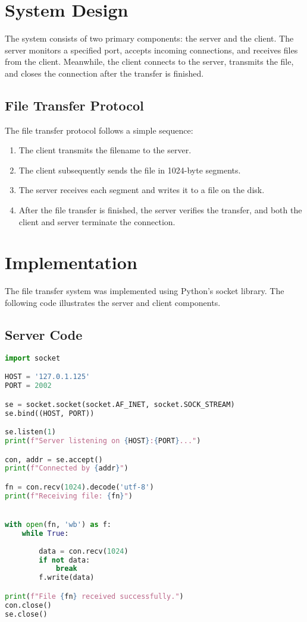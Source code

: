 \documentclass[a4paper,12pt]{article}
\begin{document}
\section{System Design}
The system consists of two primary components: the server and the client. The server monitors a specified port, accepts incoming connections, and receives files from the client. Meanwhile, the client connects to the server, transmits the file, and closes the connection after the transfer is finished.

\subsection{File Transfer Protocol}
The file transfer protocol follows a simple sequence:
\begin{enumerate}
    \item The client transmits the filename to the server.
    \item The client subsequently sends the file in 1024-byte segments.
    \item The server receives each segment and writes it to a file on the disk.
    \item After the file transfer is finished, the server verifies the transfer, and both the client and server terminate the connection.
\end{enumerate}

\section{Implementation}
The file transfer system was implemented using Python's socket library. The following code illustrates the server and client components.

\subsection{Server Code}

\begin{lstlisting}[language=Python, caption=Server Code]
import socket

HOST = '127.0.1.125'  
PORT = 2002   

se = socket.socket(socket.AF_INET, socket.SOCK_STREAM)
se.bind((HOST, PORT))

se.listen(1)
print(f"Server listening on {HOST}:{PORT}...")

con, addr = se.accept()
print(f"Connected by {addr}")

fn = con.recv(1024).decode('utf-8') 
print(f"Receiving file: {fn}")


with open(fn, 'wb') as f:
    while True:
        
        data = con.recv(1024)
        if not data:
            break  
        f.write(data)

print(f"File {fn} received successfully.")
con.close() 
se.close()
\end{lstlisting}
\end{document}
